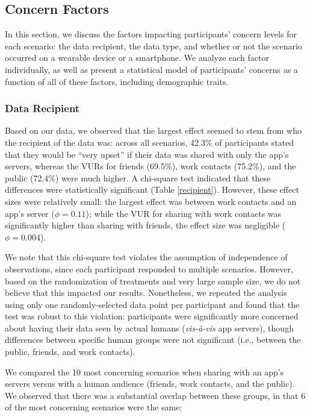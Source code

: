 \documentclass{acm_proc_article-sp}
\begin{document}
\subsection{Concern Factors}
In this section, we discuss the factors impacting participants' concern levels for each scenario: the data recipient, the data type, and whether or not the scenario occurred on a wearable device or a smartphone. We analyze each factor individually, as well as present a statistical model of participants' concerns as a function of all of these factors, including demographic traits.

\subsubsection{Data Recipient}
Based on our data, we observed that the largest effect seemed to stem from who the recipient of the data was: across all scenarios, 42.3\% of participants stated that they would be ``very upset'' if their data was shared with only the app's servers, whereas the VURs for friends (69.5\%), work contacts (75.2\%), and the public (72.4\%) were much higher. A chi-square test indicated that these differences were statistically significant (Table \ref{recipient}). However, these effect sizes were relatively small: the largest effect was between work contacts and an app's server ($\phi=0.11$); while the VUR for sharing with work contacts was significantly higher than sharing with friends, the effect size was negligible ($\phi=0.004$).

We note that this chi-square test violates the assumption of independence of observations, since each participant responded to multiple scenarios. However, based on the randomization of treatments and very large sample size, we do not believe that this impacted our results. Nonetheless, we repeated the analysis using only one randomly-selected data point per participant and found that the test was robust to this violation: participants were significantly more concerned about having their data seen by actual humans ({\it vis-{\`a}-vis} app servers), though differences between specific human groups were not significant (i.e., between the public, friends, and work contacts).


We compared the 10 most concerning scenarios when sharing with an app's servers versus with a human audience (friends, work contacts, and the public). We observed that there was a substantial overlap between these groups, in that 6 of the most concerning scenarios were the same: \\[-.8cm]
\end{document}
